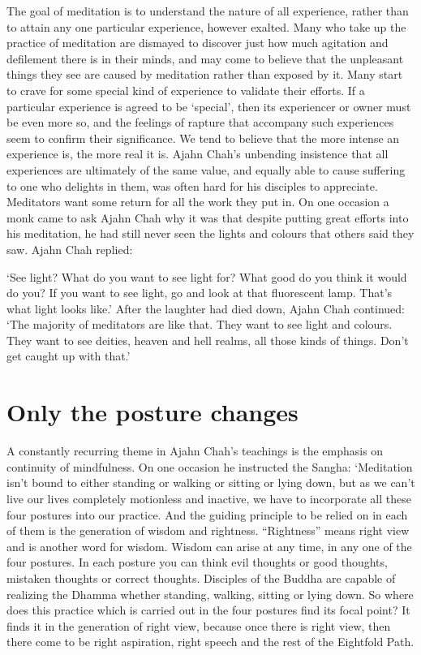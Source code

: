 The goal of meditation is to understand the nature of all experience, 
rather than to attain any one particular experience, however exalted. 
Many who take up the practice of meditation are dismayed to discover
just how much agitation and defilement there is in their minds, and may
come to believe that the unpleasant things they see are caused by
meditation rather than exposed by it. Many start to crave for some
special kind of experience to validate their efforts. If a particular
experience is agreed to be `special', then its experiencer or owner must
be even more so, and the feelings of rapture that accompany such
experiences seem to confirm their significance. We tend to believe that
the more intense an experience is, the more real it is. Ajahn Chah's
unbending insistence that all experiences are ultimately of the same
value, and equally able to cause suffering to one who delights in them, 
was often hard for his disciples to appreciate. Meditators want some
return for all the work they put in. On one occasion a monk came to ask
Ajahn Chah why it was that despite putting great efforts into his
meditation, he had still never seen the lights and colours that others
said they saw. Ajahn Chah replied: 

`See light? What do you want to see light for? What good do you think it
would do you? If you want to see light, go and look at that fluorescent
lamp. That's what light looks like.' After the laughter had died down, 
Ajahn Chah continued: `The majority of meditators are like that. They
want to see light and colours. They want to see deities, heaven and hell
realms, all those kinds of things. Don't get caught up with that.'

\vspace*{\baselineskip}
\section{Only the posture changes}

A constantly recurring theme in Ajahn Chah's teachings is the emphasis
on continuity of mindfulness. On one occasion he instructed the Sangha: 
`Meditation isn't bound to either standing or walking or sitting or
lying down, but as we can't live our lives completely motionless and
inactive, we have to incorporate all these four postures into our
practice. And the guiding principle to be relied on in each of them is
the generation of wisdom and rightness. ``Rightness'' means right view and
is another word for wisdom. Wisdom can arise at any time, in any one of
the four postures. In each posture you can think evil thoughts or good
thoughts, mistaken thoughts or correct thoughts. Disciples of the Buddha
are capable of realizing the Dhamma whether standing, walking, sitting
or lying down. So where does this practice which is carried out in the
four postures find its focal point? It finds it in the generation of
right view, because once there is right view, then there come to be
right aspiration, right speech and the rest of the Eightfold Path. 

